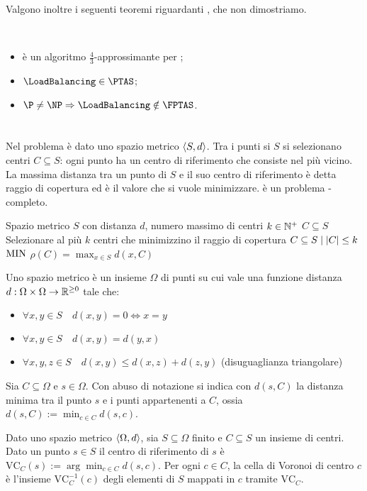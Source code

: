 Valgono inoltre i seguenti teoremi riguardanti \LoadBalancing, che non dimostriamo.
\begin{theorem}~
	\begin{itemize}
		\item \SortedGreedyBalance è un algoritmo $\frac43$-approssimante per \LoadBalancing \cite{Graham:69:sortedgreedybalance};
		\item $\LoadBalancing\in\PTAS$;
		\item $\P\neq\NP\impl\LoadBalancing\notin\FPTAS$.
	\end{itemize}
\end{theorem}



\section{\CenterSelection}
Nel problema \CenterSelection è dato uno spazio metrico $\langle S,d \rangle$.
Tra i punti si $S$ si selezionano centri $C\subseteq S$: ogni punto ha un centro di riferimento che consiste nel più vicino.
La massima distanza tra un punto di $S$ e il suo centro di riferimento è detta raggio di copertura ed è il valore che si vuole minimizzare.
\CenterSelection è un problema \NPO-completo.

\popt{\CenterSelection}
{Spazio metrico $S$ con distanza $d$, numero massimo di centri $k\in\mathbb N^+$}
{$C\subseteq S$}
{Selezionare al più $k$ centri che minimizzino il raggio di copertura}
{$C\subseteq S\mid | C |\leq k$}
{$\mathrm{MIN}$}
{$\rho(C) = \max_{x \in S} d(x, C)$}

Uno spazio metrico è un insieme $\Omega$ di punti su cui vale una funzione distanza $d:\Omega\times\Omega\to\mathbb R^{\geq0}$ tale che:
\begin{itemize}
	\item $\forall x,y\in S\quad d(x,y)=0\iff x=y$
	\item $\forall x,y\in S\quad d(x,y)=d(y,x)$
	\item $\forall x,y,z\in S\quad d(x,y)\leq d(x,z)+d(z,y)$ (disuguaglianza triangolare)
\end{itemize}
Sia $C\subseteq\Omega$ e $s\in\Omega$. Con abuso di notazione si indica con $d(s,C)$ la distanza minima tra il punto $s$ e i punti appartenenti a $C$, ossia $d(s,C):=\min_{c\in C} d(s,c)$.

\begin{defin}
	Dato uno spazio metrico $\langle \Omega,d \rangle$, sia $S\subseteq\Omega$ finito e $C\subseteq S$ un insieme di centri.
	Dato un punto $s\in S$ il centro di riferimento di $s$ è $\text{VC}_C(s):=\arg\min_{c\in C} d(s,c)$.
	Per ogni $c\in C$, la cella di Voronoi di centro $c$ è l'insieme $\text{VC}_C^{-1}(c)$ degli elementi di $S$ mappati in $c$ tramite $\text{VC}_C$.
\end{defin}

